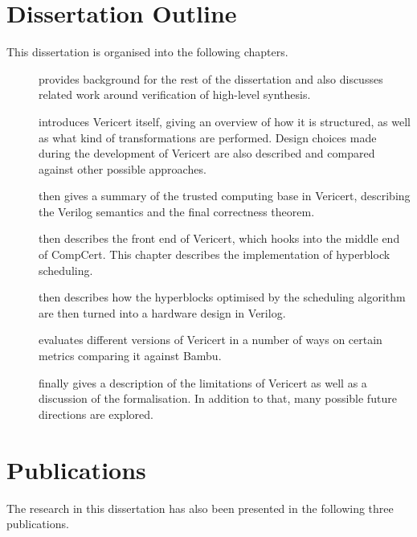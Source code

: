 \section{Dissertation Outline}

This dissertation is organised into the following chapters.

\begin{description}
\item[] provides background for the rest of the
  dissertation and also discusses related work around verification of high-level
  synthesis.
\item[] introduces Vericert itself, giving an
  overview of how it is structured, as well as what kind of transformations are
  performed.  Design choices made during the development of Vericert are also
  described and compared against other possible approaches.
\item[] then gives a summary of the trusted
  computing base in Vericert, describing the Verilog semantics and the final
  correctness theorem.
\item[] then describes the front end of
  Vericert, which hooks into the middle end of \gls{CompCert}.  This chapter
  describes the implementation of hyperblock scheduling.
\item[] then describes how the hyperblocks
  optimised by the scheduling algorithm are then turned into a hardware design
  in Verilog.
\item[] evaluates different versions of Vericert in a
  number of ways on certain metrics comparing it against Bambu.
\item[] finally gives a description of the limitations of
  Vericert as well as a discussion of the formalisation.  In addition to that,
  many possible future directions are explored.
\end{description}

\section{Publications}

The research in this dissertation has also been presented in the following three
publications.

